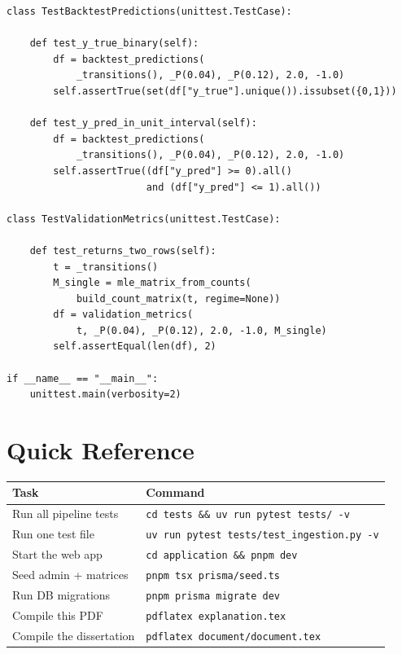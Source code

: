 \documentclass[12pt,a4paper]{article}
\begin{document}
\begin{lstlisting}[caption={test\_validation.py --- Stage 5: Backtesting Metrics}]
class TestBacktestPredictions(unittest.TestCase):

    def test_y_true_binary(self):
        df = backtest_predictions(
            _transitions(), _P(0.04), _P(0.12), 2.0, -1.0)
        self.assertTrue(set(df["y_true"].unique()).issubset({0,1}))

    def test_y_pred_in_unit_interval(self):
        df = backtest_predictions(
            _transitions(), _P(0.04), _P(0.12), 2.0, -1.0)
        self.assertTrue((df["y_pred"] >= 0).all()
                        and (df["y_pred"] <= 1).all())

class TestValidationMetrics(unittest.TestCase):

    def test_returns_two_rows(self):
        t = _transitions()
        M_single = mle_matrix_from_counts(
            build_count_matrix(t, regime=None))
        df = validation_metrics(
            t, _P(0.04), _P(0.12), 2.0, -1.0, M_single)
        self.assertEqual(len(df), 2)

if __name__ == "__main__":
    unittest.main(verbosity=2)
\end{lstlisting}

\newpage
\section{Quick Reference}
\label{sec:quickref}

\begin{center}
\begin{tabular}{ll}
  \toprule
  Task & Command \\
  \midrule
  Run all pipeline tests     & \texttt{cd tests \&\& uv run pytest tests/ -v} \\
  Run one test file          & \texttt{uv run pytest tests/test\_ingestion.py -v} \\
  Start the web app          & \texttt{cd application \&\& pnpm dev} \\
  Seed admin + matrices      & \texttt{pnpm tsx prisma/seed.ts} \\
  Run DB migrations          & \texttt{pnpm prisma migrate dev} \\
  Compile this PDF           & \texttt{pdflatex explanation.tex} \\
  Compile the dissertation   & \texttt{pdflatex document/document.tex} \\
  \bottomrule
\end{tabular}
\end{center}
\end{document}

